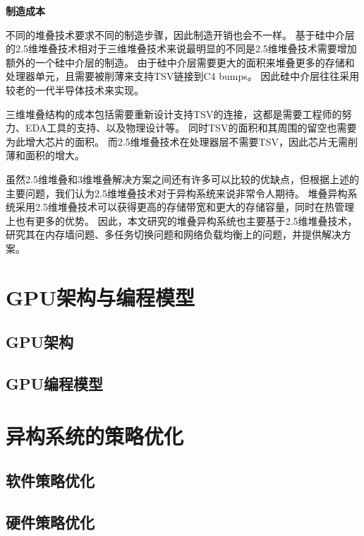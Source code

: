 \textbf{制造成本}

不同的堆叠技术要求不同的制造步骤，因此制造开销也会不一样。
基于硅中介层的2.5维堆叠技术相对于三维堆叠技术来说最明显的不同是2.5维堆叠技术需要增加额外的一个硅中介层的制造。
由于硅中介层需要更大的面积来堆叠更多的存储和处理器单元，且需要被削薄来支持TSV链接到C4 bumps。
因此硅中介层往往采用较老的一代半导体技术来实现。

三维堆叠结构的成本包括需要重新设计支持TSV的连接，这都是需要工程师的努力、EDA工具的支持、以及物理设计等。
同时TSV的面积和其周围的留空也需要为此增大芯片的面积。
而2.5维堆叠技术在处理器层不需要TSV，因此芯片无需削薄和面积的增大。

虽然2.5维堆叠和3维堆叠解决方案之间还有许多可以比较的优缺点，但根据上述的主要问题，我们认为2.5维堆叠技术对于异构系统来说非常令人期待。
堆叠异构系统采用2.5维堆叠技术可以获得更高的存储带宽和更大的存储容量，同时在热管理上也有更多的优势。
因此，本文研究的堆叠异构系统也主要基于2.5维堆叠技术，研究其在内存墙问题、多任务切换问题和网络负载均衡上的问题，并提供解决方案。

\section{GPU架构与编程模型}

\subsection{GPU架构}

\subsection{GPU编程模型}


\section{异构系统的策略优化}

\subsection{软件策略优化}

\subsection{硬件策略优化}

















